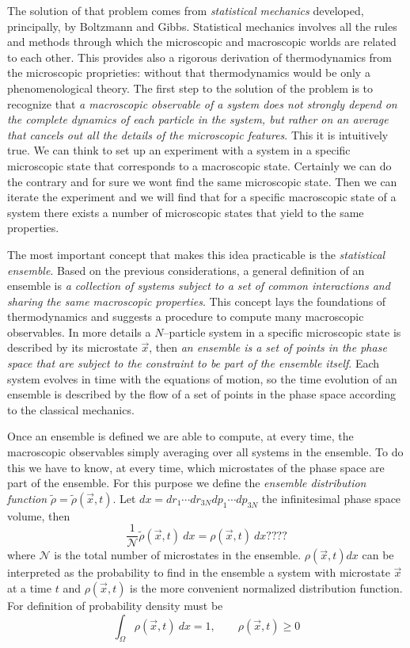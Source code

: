 The solution of that problem comes from \textit{statistical mechanics} developed, principally, by Boltzmann and 
Gibbs. Statistical mechanics involves all the rules and methods through which the microscopic and macroscopic 
worlds are related to each other. This provides also a rigorous derivation of thermodynamics from the microscopic 
proprieties: without that thermodynamics would be only a phenomenological theory. The first step to the solution 
of the problem is to recognize that \textit{a macroscopic observable of a system does not strongly depend on the 
complete dynamics of each particle in the system, but rather on an average that cancels out all the details of 
the microscopic features}. This it is intuitively true. We can think to set up an experiment with a system in a 
specific microscopic state that corresponds to a macroscopic state. Certainly we can do the contrary and for sure 
we wont find the same microscopic state. Then we can iterate the experiment and we will find that for a specific 
macroscopic state of a system there exists a number of microscopic states that yield to the same properties.

The most important concept that makes this idea practicable is the \textit{statistical ensemble}. Based on the 
previous considerations, a general definition of an ensemble is \textit{a collection of systems subject to a set 
of common interactions and sharing the same macroscopic properties}. This concept lays the foundations of 
thermodynamics and suggests a procedure to compute many macroscopic observables. In more details a 
$N$--particle system in a specific microscopic state is described by its microstate $\vec x$, then \textit{an 
ensemble is a set of points in the phase space that are subject to the constraint to be part of the ensemble 
itself}. Each system evolves in time with the equations of motion, so the time evolution of an ensemble is 
described by the flow of a set of points in the phase space according to the classical mechanics.

Once an ensemble is defined we are able to compute, at every time, the macroscopic observables simply averaging 
over all systems in the ensemble. To do this we have to know, at every time, which microstates of the phase space 
are part of the ensemble. For this purpose we define the \textit{ensemble distribution function} 
$\tilde\rho = \tilde\rho(\vec x,t)$. Let $dx = dr_1\cdots dr_{3N} dp_1 \cdots dp_{3N}$ the infinitesimal phase 
space volume, then
\begin{equation*}
	\frac{1}{\mathcal{N}}\tilde\rho(\vec x, t)\ dx = \rho(\vec x, t)\ dx ????
\end{equation*}
where $\mathcal{N}$ is the total number of microstates in the ensemble. $\rho(\vec x, t)dx$ can be interpreted as 
the probability to find in the ensemble a system with microstate $\vec x$ at a time $t$ and $\rho(\vec x, t)$ is 
the more convenient normalized distribution function. For definition of probability density must be
\begin{equation*}
	\int_{\Omega} \rho(\vec x, t)\ dx = 1, \qquad \rho(\vec x, t) \ge 0
\end{equation*}


